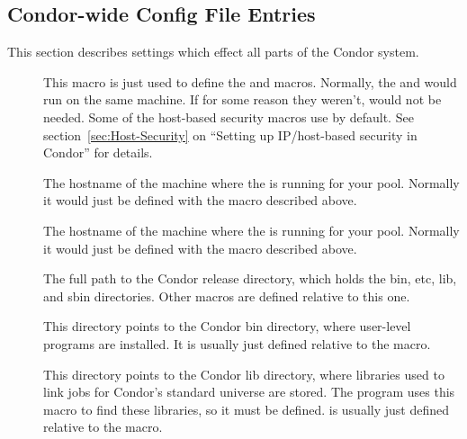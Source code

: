 \subsection{\label{sec:Condor-wide-Config-File-Entries}
Condor-wide Config File Entries}
This section describes settings which effect all parts of the Condor
system. 
\begin{description}
  
\item[] \label{param:CondorHost} This macro is
  just used to define the  and
   macros.  Normally, the 
  and  would run on the same machine.  If for some
  reason they weren't,  would not be needed.  Some
  of the host-based security macros use  by
  default.  See section~\ref{sec:Host-Security} on ``Setting up
  IP/host-based security in Condor'' for details.
  
\item[] \label{param:CollectorHost} The
  hostname of the machine where the  is running for
  your pool.  Normally it would just be defined with the
   macro described above.

\item[] \label{param:NegotiatorHost} The
  hostname of the machine where the  is running for
  your pool.  Normally it would just be defined with the
   macro described above.

\item[] \label{param:ReleaseDir} The full path to
  the Condor release directory, which holds the bin, etc, lib, and
  sbin directories.  Other macros are defined relative to this one.

\item[] \label{param:Bin} This directory points to the
  Condor bin directory, where user-level programs are installed.  It
  is usually just defined relative to the  macro.
  
\item[] \label{param:Lib} This directory points to the
  Condor lib directory, where libraries used to link jobs for Condor's
  standard universe are stored.  The  program uses
  this macro to find these libraries, so it must be defined.
   is usually just defined relative to the
   macro.


\end{description}
